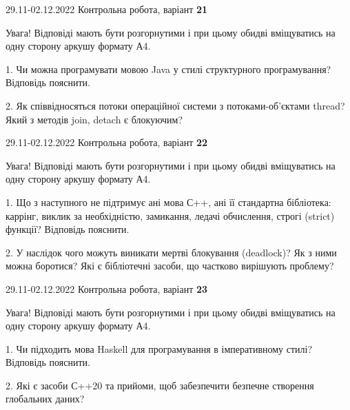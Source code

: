 \documentclass[11pt, ukrainian]{article}
\begin{document}
\vspace{4mm}
\newpage
{29.11-02.12.2022 Контрольна робота, варіант  \No \textbf { 21 }\par}
Увага! Відповіді мають бути розгорнутими і при цьому обидві вміщуватись на одну сторону аркушу формату А4.

{
\begin {large}

1. Чи можна програмувати мовою Java у стилі структурного програмування? Відповідь пояснити.%

2. Як співвідносяться потоки операційної системи з потоками-об’єктами thread? Який з методів join, detach є блокуючим?

\end {large}}

\vspace{4mm}



{29.11-02.12.2022 Контрольна робота, варіант  \No \textbf { 22 }\par}
Увага! Відповіді мають бути розгорнутими і при цьому обидві вміщуватись на одну сторону аркушу формату А4.

{
\begin {large}

1. Що з наступного не підтримує ані мова С++, ані її стандартна бібліотека: каррінг, виклик за необхідністю, замикання, ледачі обчислення, строгі (strict) функції? Відповідь пояснити.%

2. У наслідок чого можуть виникати мертві блокування (deadlock)? Як з ними можна боротися? Які є бібліотечні засоби, що частково вирішують проблему?

\end {large}}

\vspace{4mm}



{29.11-02.12.2022 Контрольна робота, варіант  \No \textbf { 23 }\par}
Увага! Відповіді мають бути розгорнутими і при цьому обидві вміщуватись на одну сторону аркушу формату А4.

{
\begin {large}

1. Чи підходить мова Haskell для програмування в імперативному стилі? Відповідь пояснити.%

2. Які є засоби С++20 та прийоми, щоб забезпечити безпечне створення глобальних даних?

\end {large}}
\end{document}
